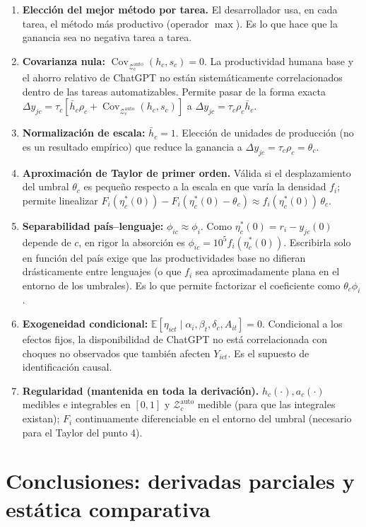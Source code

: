 \documentclass[11pt,a4paper]{article}
\newcommand{\Zauto}{\mathcal{Z}^{\mathrm{auto}}_c}
\newcommand{\Covauto}{\operatorname{Cov}_{\Zauto}}
\begin{document}
\begin{enumerate}[leftmargin=1.6em,itemsep=0.35em]
  \item \textbf{Elección del mejor método por tarea.} El desarrollador usa, en cada tarea, el método más productivo (operador $\max$). Es lo que hace que la ganancia sea no negativa tarea a tarea.
  \item \textbf{Covarianza nula:} $\Covauto(h_c,s_c)=0$. La productividad humana base y el ahorro relativo de ChatGPT no están sistemáticamente correlacionados dentro de las tareas automatizables. Permite pasar de la forma exacta $\Delta y_{jc}=\tau_c[\bar h_c\rho_c+\Covauto(h_c,s_c)]$ a $\Delta y_{jc}=\tau_c\rho_c\bar h_c$.
  \item \textbf{Normalización de escala:} $\bar h_c=1$. Elección de unidades de producción (no es un resultado empírico) que reduce la ganancia a $\Delta y_{jc}=\tau_c\rho_c=\theta_c$.
  \item \textbf{Aproximación de Taylor de primer orden.} Válida si el desplazamiento del umbral $\theta_c$ es pequeño respecto a la escala en que varía la densidad $f_i$; permite linealizar $F_i(\eta_c^*(0))-F_i(\eta_c^*(0)-\theta_c)\approx f_i(\eta_c^*(0))\,\theta_c$.
  \item \textbf{Separabilidad país--lenguaje:} $\phi_{ic}\approx\phi_i$. Como $\eta_c^*(0)=r_i-y_{jc}(0)$ depende de $c$, en rigor la absorción es $\phi_{ic}=10^5 f_i(\eta_c^*(0))$. Escribirla solo en función del país exige que las productividades base no difieran drásticamente entre lenguajes (o que $f_i$ sea aproximadamente plana en el entorno de los umbrales). Es lo que permite factorizar el coeficiente como $\theta_c\phi_i$.
  \item \textbf{Exogeneidad condicional:} $\mathbb{E}[\eta_{ict}\mid\alpha_i,\beta_t,\delta_c,A_{it}]=0$. Condicional a los efectos fijos, la disponibilidad de ChatGPT no está correlacionada con choques no observados que también afecten $Y_{ict}$. Es el supuesto de identificación causal.
  \item \textbf{Regularidad (mantenida en toda la derivación).} $h_c(\cdot),a_c(\cdot)$ medibles e integrables en $[0,1]$ y $\Zauto$ medible (para que las integrales existan); $F_i$ continuamente diferenciable en el entorno del umbral (necesario para el Taylor del punto 4).
\end{enumerate}

\section{Conclusiones: derivadas parciales y estática comparativa}
\end{document}
